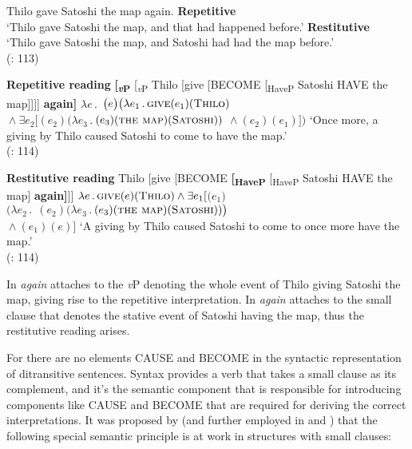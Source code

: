 \documentclass[output=paper]{langscibook}
\begin{document}
 \ea\label{ex:bondarenko:9}{Thilo gave Satoshi the map again.}
\ea \textbf{Repetitive}\\`Thilo gave Satoshi the map, and that had happened before.'
\ex \textbf{Restitutive}\\`Thilo gave Satoshi the map, and Satoshi had had the map before.'\\
\hfill(\citealt{Beck-Johnson2004}: 113)
\z
\z

\ea\label{ex:bondarenko:10}\textbf{Repetitive reading}
\ea \textbf{[\textit{\textsubscript{v}}}\textbf{\textsubscript{P}}\textsubscript{}  [\textit{\textsubscript{v}}\textsubscript{P} Thilo [give [BECOME [\textsubscript{HaveP} Satoshi HAVE the map]]]] \textbf{again]}
\ex $\lambda e\,.\;$$\,\big(e\big)\big(\lambda e_1\,.\,\textsc{give}(e_1)(\textsc{Thilo})$\\
\tabto{1cm}${}\wedge\exists e_2[$$(e_2)(\lambda e_3\,.\,$$(e_3)(\textsc{the map})(\textsc{Satoshi}))$
\tabto{1cm}${}\wedge{}$$(e_2)(e_1)]\big)$
\ex     `Once more, a giving by Thilo caused Satoshi to come to have   the map.'\\
\hfill(\citealt{Beck-Johnson2004}: 114)
\z
\z


 \ea\label{ex:bondarenko:11}\textbf{Restitutive reading}
\ea Thilo [give [BECOME \textbf{[\textsubscript{HaveP}} [\textsubscript{HaveP} Satoshi HAVE the map] \textbf{again]}]]
\ex $\lambda e\,.\,\textsc{give}(e)(\textsc{Thilo})\wedge\exists e_1[$$\big(e_1\big)$\\
\tabto{1cm}$\big(\lambda e_2\,.\;$$\,(e_2)(\lambda e_3\,.\,$$(e_3)(\textsc{the map})(\textsc{Satoshi}))\big)$\\
\tabto{1cm}${}\wedge{}$$(e_1)(e)]$
\ex     `A giving by Thilo caused Satoshi to come to once more have the   map.'\\
\hfill(\citealt{Beck-Johnson2004}: 114)
\z
\z

\noindent In  \textit{again} attaches to the \textit{v}P denoting the whole event of Thilo giving Satoshi the map, giving rise to the repetitive interpretation. In  \textit{again} attaches to the small clause that denotes the stative event of Satoshi having the map, thus the restitutive reading arises.



For \citet{Beck-Johnson2004} there are no elements CAUSE and BECOME in the syntactic representation of ditransitive sentences. Syntax provides a verb that takes a small clause as its complement, and it’s the semantic component that is responsible for introducing components like CAUSE and BECOME that are required for deriving the correct interpretations. It was proposed by \citet{vonStechow1995Lexicaldecompositionsyntax} (and further employed in \citealt{Beck-Johnson2004} and \citealt{Beck2005}) that the following special semantic principle is at work in structures with small clauses:
\end{document}
